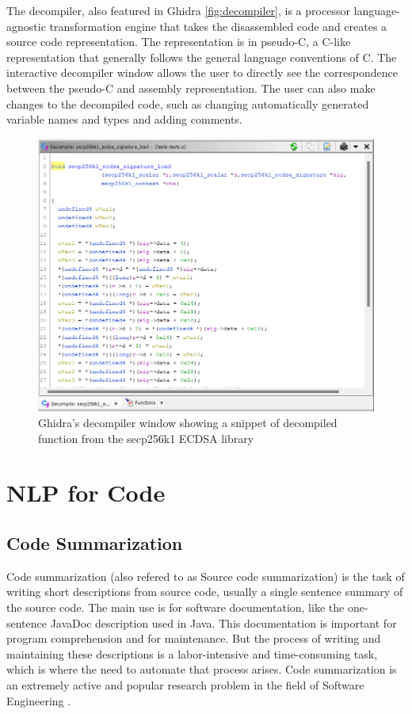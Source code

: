 The decompiler, also featured in Ghidra \ref{fig:decompiler}, is a processor language-agnostic transformation engine that takes the disassembled code and creates a source code representation. The representation is in pseudo-C, a C-like representation that generally follows the general language conventions of C. The interactive decompiler window allows the user to directly see the correspondence between the pseudo-C and assembly representation. The user can also make changes to the decompiled code, such as changing automatically generated variable names and types and adding comments. 

\label{fig:decompiler}
\begin{figure}[H]
  \centering
  \includegraphics[width=\linewidth]{img/decompiler.png}
  \caption{Ghidra's decompiler window showing a snippet of decompiled function from the secp256k1 ECDSA library}
\end{figure}

\newpage
\section{NLP for Code}

\subsection{Code Summarization}
Code summarization (also refered to as Source code summarization) is the task of writing short descriptions from source code, usually a single sentence summary of the source code. The main use is for software documentation, like the one-sentence JavaDoc description used in Java\cite{leclair_recommendations}. This documentation is important for program comprehension and for maintenance. But the process of writing and maintaining these descriptions is a labor-intensive and time-consuming task, which is where the need to automate that process arises. Code summarization is an extremely active and popular research problem in the field of Software Engineering \cite{leclair_recommendations}.

